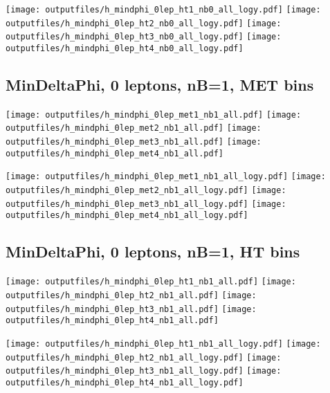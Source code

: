 \documentclass[11pt]{article}
\begin{document}
    \noindent
     \texttt{[image: outputfiles/h\_mindphi\_0lep\_ht1\_nb0\_all\_logy.pdf]}
     \texttt{[image: outputfiles/h\_mindphi\_0lep\_ht2\_nb0\_all\_logy.pdf]}
     \texttt{[image: outputfiles/h\_mindphi\_0lep\_ht3\_nb0\_all\_logy.pdf]}
     \texttt{[image: outputfiles/h\_mindphi\_0lep\_ht4\_nb0\_all\_logy.pdf]}

    \clearpage


    \subsection{ MinDeltaPhi, 0 leptons, nB=1, MET bins }

    \noindent
     \texttt{[image: outputfiles/h\_mindphi\_0lep\_met1\_nb1\_all.pdf]}
     \texttt{[image: outputfiles/h\_mindphi\_0lep\_met2\_nb1\_all.pdf]}
     \texttt{[image: outputfiles/h\_mindphi\_0lep\_met3\_nb1\_all.pdf]}
     \texttt{[image: outputfiles/h\_mindphi\_0lep\_met4\_nb1\_all.pdf]}

    \noindent
     \texttt{[image: outputfiles/h\_mindphi\_0lep\_met1\_nb1\_all\_logy.pdf]}
     \texttt{[image: outputfiles/h\_mindphi\_0lep\_met2\_nb1\_all\_logy.pdf]}
     \texttt{[image: outputfiles/h\_mindphi\_0lep\_met3\_nb1\_all\_logy.pdf]}
     \texttt{[image: outputfiles/h\_mindphi\_0lep\_met4\_nb1\_all\_logy.pdf]}

    \clearpage



    \subsection{ MinDeltaPhi, 0 leptons, nB=1, HT bins }

    \noindent
     \texttt{[image: outputfiles/h\_mindphi\_0lep\_ht1\_nb1\_all.pdf]}
     \texttt{[image: outputfiles/h\_mindphi\_0lep\_ht2\_nb1\_all.pdf]}
     \texttt{[image: outputfiles/h\_mindphi\_0lep\_ht3\_nb1\_all.pdf]}
     \texttt{[image: outputfiles/h\_mindphi\_0lep\_ht4\_nb1\_all.pdf]}

    \noindent
     \texttt{[image: outputfiles/h\_mindphi\_0lep\_ht1\_nb1\_all\_logy.pdf]}
     \texttt{[image: outputfiles/h\_mindphi\_0lep\_ht2\_nb1\_all\_logy.pdf]}
     \texttt{[image: outputfiles/h\_mindphi\_0lep\_ht3\_nb1\_all\_logy.pdf]}
     \texttt{[image: outputfiles/h\_mindphi\_0lep\_ht4\_nb1\_all\_logy.pdf]}
\end{document}
